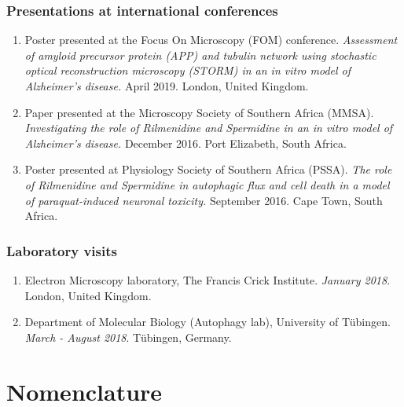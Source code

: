 \subsection*{Presentations at international conferences}
\begin{enumerate}
\item Poster presented at the Focus On Microscopy (FOM) conference. \textit{Assessment of amyloid precursor protein (APP) and tubulin network using stochastic optical reconstruction microscopy (STORM) in an in vitro model of Alzheimer's disease.} April 2019. London, United Kingdom.
\item Paper presented at the Microscopy Society of Southern Africa (MMSA). \textit{Investigating the role of Rilmenidine and Spermidine in an in vitro model of Alzheimer's disease.} December 2016. Port Elizabeth, South Africa.
\item Poster presented at Physiology Society of Southern Africa (PSSA). \textit{The role of Rilmenidine and Spermidine in autophagic flux and cell death in a model of paraquat-induced neuronal toxicity.} September 2016. Cape Town, South Africa.
\end{enumerate}

\subsection*{Laboratory visits}
\begin{enumerate}
\item Electron Microscopy laboratory, The Francis Crick Institute. \textit{January 2018}. London, United Kingdom.
\item Department of Molecular Biology (Autophagy lab), University of T{\"u}bingen. \textit{March - August 2018}. T{\"u}bingen, Germany.
\end{enumerate}
\newpage

\setcounter{secnumdepth}{4}
\setcounter{tocdepth}{4}

\tableofcontents
\newpage

\listoffigures
\newpage

\listoftables
\newpage

\chapter*{Nomenclature}
